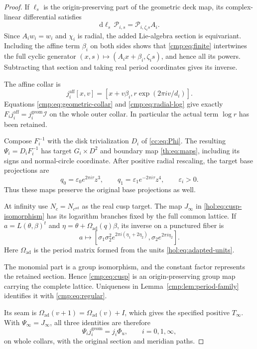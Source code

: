 \documentclass[11pt]{article}
\numberwithin{equation}{section}
\begin{document}
\begin{proof}
If $\ell_s$ is the origin-preserving part of the geometric deck map,
its complex-linear differential satisfies
\[
 \mathrm d\ell_s\,\mathcal P_{i,s}
       =\mathcal P_{i,\zeta_i s}A_i.
\]
Since $A_iw_i=w_i$ and $\chi_i$ is radial, the added Lie-algebra
section is equivariant. Including the affine term $\beta_i$ on both
sides shows that \eqref{cmp:eq:finite} intertwines the full cyclic
generator $(x,s)\mapsto(A_ix+\beta_i,\zeta_i s)$, and hence all its
powers. Subtracting that section and taking real period coordinates
gives its inverse.

The affine collar is
\[
 j_i^{\mathrm{aff}}[x,v]
       =[x+v\beta_i,r\exp(2\pi iv/d_i)].
\]
Equations \eqref{cmp:eq:geometric-collar} and
\eqref{cmp:eq:radial-log} give exactly
$F_i j_i^{\mathrm{aff}}=j_i^{\mathrm{geom}}\mathcal I$ on the
whole outer collar. In particular the actual term $\log r$ has
been retained.

Compose $F_i^{-1}$ with the disk trivialization
$D_i$ of \eqref{cc:eq:Phi}. The resulting
$\Psi_i=D_iF_i^{-1}$ has target $G_i\times D^2$ and boundary map
\eqref{th:eq:maps}, including its signs and normal-circle coordinate.
After positive radial rescaling, the target base projections are
\[
 q_0=\varepsilon_0 e^{2\pi i\tau}z^3,\qquad
 q_1=\varepsilon_1 e^{-2\pi i\tau}z^4,
 \qquad\varepsilon_i>0.
\]
Thus these maps preserve the original base projections as well.

At infinity use $N_c=N_{c^{\mathrm{ad}}}$ as the real cusp target.
The map $J_\infty$ in \eqref{hol:eq:cusp-isomorphism} has its
logarithm branches fixed by the full common lattice. If
$a=L(\theta,\beta)^t$ and
$\eta=\theta+\Omega_{\mathrm{ad}}(q)\beta$, its inverse on a
punctured fiber is
\begin{equation}\label{cmp:eq:cusp}
 a\longmapsto
 \left[\sigma_1\sigma_2^2 e^{2\pi i(\eta_1+2\eta_2)},
       \sigma_2 e^{2\pi i\eta_2}\right].
\end{equation}
Here $\Omega_{\mathrm{ad}}$ is the period matrix formed from the
units \eqref{hol:eq:adapted-units}.

The monomial part is a group
isomorphism, and the constant factor represents the retained
section. Hence \eqref{cmp:eq:cusp} is an origin-preserving group
map carrying the complete lattice. Uniqueness in
Lemma~\ref{cmp:lem:period-family} identifies it with
\eqref{cmp:eq:regular}.

Its seam is
$\Omega_{\mathrm{ad}}(v+1)=\Omega_{\mathrm{ad}}(v)+I$,
which gives the specified positive $T_\infty$.
With $\Psi_\infty=J_\infty$, all three identities are therefore
\begin{equation}\label{cmp:eq:three-collars}
 \Psi_i j_i^{\mathrm{geom}}=j_i\Phi_u,
 \qquad i=0,1,\infty,
\end{equation}
on whole collars, with the original section and meridian paths.


\end{proof}
\end{document}
